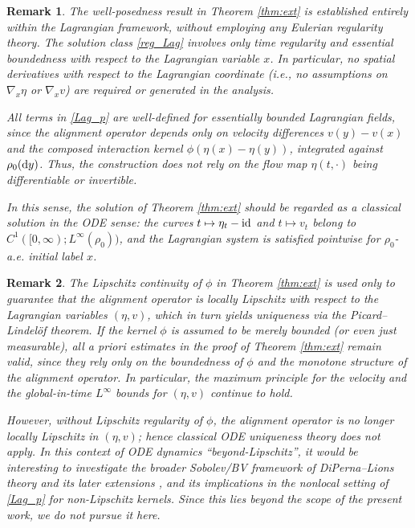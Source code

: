 \documentclass[10pt,reqno]{amsart}
\numberwithin{equation}{section}
\newtheorem{remark}{Remark}[section]
\newcommand{\dy}{\textnormal{d}y}
\begin{document}
\begin{remark} The well-posedness result in Theorem \ref{thm:ext} is established entirely within the Lagrangian framework, without employing any Eulerian regularity theory. The solution class \eqref{reg_Lag} involves only time regularity and essential boundedness with respect to the Lagrangian variable $x$. In particular, no spatial derivatives with respect to the Lagrangian coordinate (i.e., no assumptions on $\nabla_x\eta$ or $\nabla_x v$) are required or generated in the analysis.

All terms in \eqref{Lag_p} are well-defined for essentially bounded Lagrangian fields, since the alignment operator depends only on velocity differences $v(y)-v(x)$ and the composed interaction kernel $\phi(\eta(x)-\eta(y))$, integrated against $\rho_0(\dy)$. Thus, the construction does not rely on the flow map $\eta(t,\cdot)$ being differentiable or invertible.

In this sense, the solution of Theorem \ref{thm:ext} should be regarded as a \emph{classical solution in the ODE sense}: the curves $t\mapsto \eta_t-{\rm id}$ and $t\mapsto v_t$ belong to $C^1([0,\infty);L^\infty(\rho_0))$, and the Lagrangian system is satisfied pointwise for $\rho_0$-a.e. initial label $x$.
\end{remark}

\begin{remark} 
The Lipschitz continuity of $\phi$ in Theorem \ref{thm:ext} is used only to guarantee that the alignment operator is locally Lipschitz with respect to the Lagrangian variables $(\eta,v)$, which in turn yields uniqueness via the Picard--Lindel\"of theorem. If the kernel $\phi$ is assumed to be merely bounded (or even just measurable), all a priori estimates in the proof of Theorem \ref{thm:ext} remain valid, since they rely only on the boundedness of $\phi$ and the monotone structure of the alignment operator. In particular, the maximum principle for the velocity and the global-in-time
$L^\infty$ bounds for $(\eta,v)$ continue to hold.

However, without Lipschitz regularity of $\phi$, the alignment operator is no longer locally Lipschitz in $(\eta,v)$; hence classical ODE uniqueness theory does not apply.  In this context of ODE dynamics ``beyond-Lipschitz'', it would be interesting to investigate  the broader Sobolev/BV framework of DiPerna--Lions theory and its later extensions \cite{DL89,Amb04}, and its implications in the nonlocal setting of \eqref{Lag_p} for non-Lipschitz kernels. Since this lies beyond the scope of the present work, we do not pursue it here.
\end{remark}
\end{document}
